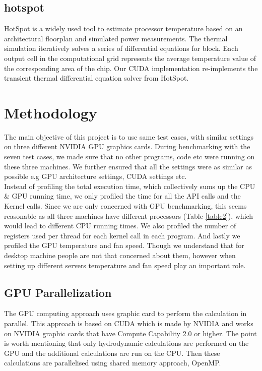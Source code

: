 \documentclass[paper=a4, fontsize=11pt]{scrartcl}
\numberwithin{equation}{section}		%
\numberwithin{figure}{section}			%
\numberwithin{table}{section}				%
\begin{document}
\subsection{hotspot}
HotSpot is a widely used tool to estimate processor temperature based on an architectural floorplan and simulated power measurements. The thermal simulation iteratively solves a series of differential equations for block. Each output cell in the computational grid represents the average temperature value of the corresponding area of the chip. Our CUDA implementation re-implements the transient thermal differential equation solver from HotSpot.






\newpage
\section{Methodology}
The main objective of this project is to use same test cases, with similar settings on three different NVIDIA GPU graphics cards. During benchmarking with the seven test cases, we made sure that no other programs, code etc were running on these three machines. We further ensured that all the settings were as similar as possible e.g GPU architecture settings, CUDA settings etc.\\


Instead of profiling the total execution time, which collectively sums up the CPU \& GPU running time, we only profiled the time for all the API calls and the Kernel calls. Since we are only concerned with GPU benchmarking, this seems reasonable as all three machines have different processors (Table \ref{table2}), which would lead to different CPU running times. We also profiled the number of registers used per thread for each kernel call in each program. And lastly we profiled the GPU temperature and fan speed. Though we understand that for desktop machine people are not that concerned about them, however when setting up different servers temperature and fan speed play an important role.  

\subsection{GPU Parallelization}
The GPU computing approach uses graphic card to perform the calculation in parallel. This approach is based on CUDA which is made by NVIDIA and works on NVIDIA graphic cards that have Compute Capability 2.0 or higher. The point is worth mentioning that only hydrodynamic calculations are performed on the GPU and the additional calculations are run on the CPU. Then these calculations are parallelised using shared memory approach, OpenMP.
\end{document}

